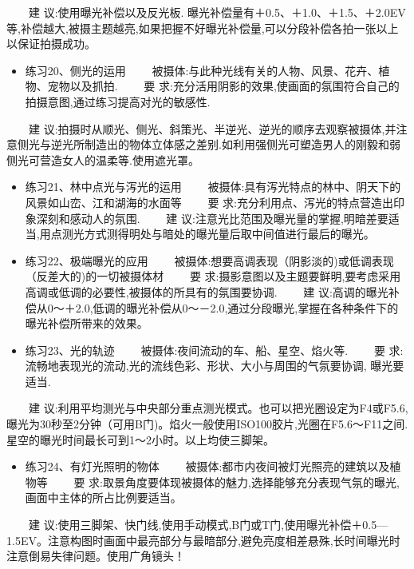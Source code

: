 \documentclass[
  letterpaper,
  DIV=11,
  numbers=noendperiod]{scrreprt}
\providecommand{\tightlist}{%
  \setlength{\itemsep}{0pt}\setlength{\parskip}{0pt}}\usepackage{longtable,booktabs,array}
\begin{document}
　　建 议:使用曝光补偿以及反光板.
曝光补偿量有＋0.5、＋1.0、＋1.5、＋2.0EV等,补偿越大,被摄主题越亮,如果把握不好曝光补偿量,可以分段补偿各拍一张以上以保证拍摄成功。

\begin{itemize}
\tightlist
\item
  练习20、侧光的运用
  　　被摄体:与此种光线有关的人物、风景、花卉、植物、宠物以及抓拍.
  　　要
  求:充分活用阴影的效果,使画面的氛围符合自己的拍摄意图,通过练习提高对光的敏感性.
\end{itemize}

　　建
议:拍摄时从顺光、侧光、斜策光、半逆光、逆光的顺序去观察被摄体,并注意侧光与逆光所制造出的物体立体感之差别.如利用强侧光可塑造男人的刚毅和弱侧光可营造女人的温柔等.使用遮光罩。

\begin{itemize}
\item
  练习21、林中点光与泻光的运用
  　　被摄体:具有泻光特点的林中、阴天下的风景如山峦、江和湖海的水面等
  　　要 求:充分利用点、泻光的特点营造出印象深刻和感动人的氛围. 　　建
  议:注意光比范围及曝光量的掌握,明暗差要适当,用点测光方式测得明处与暗处的曝光量后取中间值进行最后的曝光。
\item
  练习22、极端曝光的应用
  　　被摄体:想要高调表现（阴影淡的)或低调表现（反差大的)的一切被摄体材
  　　要
  求:摄影意图以及主题要鲜明,要考虑采用高调或低调的必要性,被摄体的所具有的氛围要协调.
  　　建
  议:高调的曝光补偿从0～＋2.0,低调的曝光补偿从0～－2.0,通过分段曝光,掌握在各种条件下的曝光补偿所带来的效果。
\item
  练习23、光的轨迹 　　被摄体:夜间流动的车、船、星空、焰火等. 　　要
  求:流畅地表现光的流动,光的流线色彩、形状、大小与周围的气氛要协调,
  曝光要适当.
\end{itemize}

　　建
议:利用平均测光与中央部分重点测光模式。也可以把光圈设定为F4或F5.6,
曝光为30秒至2分钟（可用B门)。焰火一般使用ISO100胶片,光圈在F5.6～F11之间.星空的曝光时间最长可到1～2小时。以上均使三脚架。

\begin{itemize}
\tightlist
\item
  练习24、有灯光照明的物体
  　　被摄体:都市内夜间被灯光照亮的建筑以及植物等 　　要
  求:取景角度要体现被摄体的魅力,选择能够充分表现气氛的曝光,画面中主体的所占比例要适当。
\end{itemize}

　　建
议:使用三脚架、快门线,使用手动模式,B门或T门,使用曝光补偿＋0.5---1.5EV。注意构图时画面中最亮部分与最暗部分,避免亮度相差悬殊,长时间曝光时注意倒易失律问题。使用广角镜头！
\end{document}
